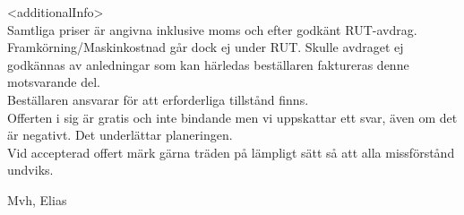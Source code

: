 \documentclass[a4paper,11pt]{extarticle}
\newcommand{\changefont}{%
        \fontsize{9}{11}\selectfont
    }
\begin{document}
\vspace{2em}
<additionalInfo> \\

Samtliga priser är angivna inklusive moms och efter godkänt RUT-avdrag. Framkörning/Maskinkostnad går dock ej under RUT. Skulle avdraget ej godkännas av anledningar som kan härledas beställaren faktureras denne motsvarande del. \\

Beställaren ansvarar för att erforderliga tillstånd finns. \\

Offerten i sig är gratis och inte bindande men vi uppskattar ett svar, även om det är negativt. Det underlättar planeringen. \\

Vid accepterad offert märk gärna träden på lämpligt sätt så att alla missförstånd undviks.

Mvh, Elias

\end{document}
